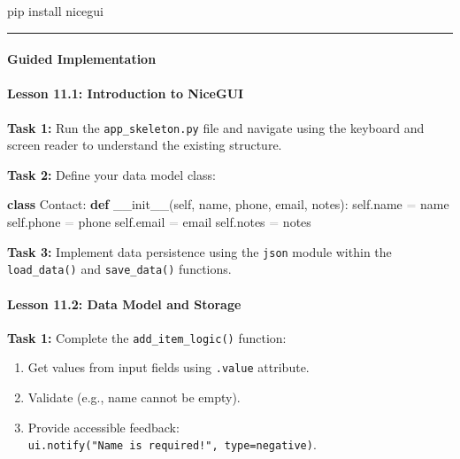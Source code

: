 \documentclass[
  justified,
  openright,
]{tufte-book}
\let\subsection\paragraph
\let\paragraph\paragraph
\newcommand{\KeywordTok}[1]{\textcolor{CodeKeyword}{\textbf{#1}}}  %
\newcommand{\CodeFuncTok}[1]{\textcolor{CodeKeyword}{#1}}           %
\newcommand{\OperatorTok}[1]{\textcolor{DarkGray}{#1}}              %
\newenvironment{Shaded}{%
  \begin{mdframed}[style=TufteCode]%
}{%
  \end{mdframed}%
}
\let\subsection\paragraph
\let\paragraph\paragraph
\providecommand{\tightlist}{%
  \setlength{\itemsep}{0pt}\setlength{\parskip}{0pt}}
\begin{document}
\begin{Shaded}
\begin{Highlighting}[]
pip install nicegui
\end{Highlighting}
\end{Shaded}

\begin{center}\rule{0.5\linewidth}{0.5pt}\end{center}

\subsection{Guided Implementation}\label{guided-implementation}

\subsection{Lesson 11.1: Introduction to
NiceGUI}\label{lesson-11.1-introduction-to-nicegui}

\textbf{Task 1:} Run the \texttt{app\_skeleton.py} file and navigate
using the keyboard and screen reader to understand the existing
structure.

\textbf{Task 2:} Define your data model class:

\begin{Shaded}
\begin{Highlighting}[]
\KeywordTok{class} Contact:
    \KeywordTok{def} \CodeFuncTok{\_\_init\_\_}(self, name, phone, email, notes):
        self.name \OperatorTok{=} name
        self.phone \OperatorTok{=} phone
        self.email \OperatorTok{=} email
        self.notes \OperatorTok{=} notes
\end{Highlighting}
\end{Shaded}

\textbf{Task 3:} Implement data persistence using the \texttt{json}
module within the \texttt{load\_data()} and \texttt{save\_data()}
functions.

\subsection{Lesson 11.2: Data Model and
Storage}\label{lesson-11.2-data-model-and-storage}

\textbf{Task 1:} Complete the \texttt{add\_item\_logic()} function:

\begin{enumerate}
\def\labelenumi{\arabic{enumi}.}
\tightlist
\item
  Get values from input fields using \texttt{.value} attribute.
\item
  Validate (e.g., name cannot be empty).
\item
  Provide accessible feedback:
  \texttt{ui.notify("Name\ is\ required!",\ type=\textquotesingle{}negative\textquotesingle{})}.
\end{enumerate}
\end{document}
